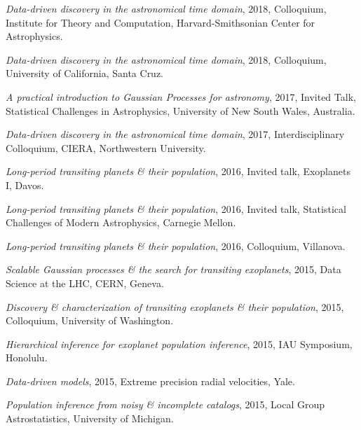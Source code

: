 \documentclass[12pt,letterpaper]{article}
\begin{document}
\begin{list}{}{\cvlist}

\item \emph{Data-driven discovery in the astronomical time domain},
    2018, Colloquium, Institute for Theory and Computation,
    Harvard-Smithsonian Center for Astrophysics.

\item \emph{Data-driven discovery in the astronomical time domain},
    2018, Colloquium, University of California, Santa Cruz.

\item \emph{A practical introduction to Gaussian Processes for astronomy},
    2017, Invited Talk, Statistical Challenges in Astrophysics,
    University of New South Wales, Australia.

\item \emph{Data-driven discovery in the astronomical time domain},
    2017, Interdisciplinary Colloquium, CIERA, Northwestern University.

\item \emph{Long-period transiting planets \& their population},
    2016, Invited talk, Exoplanets I, Davos.

\item \emph{Long-period transiting planets \& their population},
    2016, Invited talk, Statistical Challenges of Modern Astrophysics,
    Carnegie Mellon.

\item \emph{Long-period transiting planets \& their population}, 2016,
    Colloquium, Villanova.

\item \emph{Scalable Gaussian processes \& the search for transiting
    exoplanets}, 2015, Data Science at the LHC, CERN, Geneva.

\item \emph{Discovery \& characterization of transiting exoplanets \& their
    population}, 2015, Colloquium, University of Washington.

\item \emph{Hierarchical inference for exoplanet population inference},
    2015, IAU Symposium, Honolulu.

\item \emph{Data-driven models}, 2015, Extreme precision radial velocities,
    Yale.

\item \emph{Population inference from noisy \& incomplete catalogs}, 2015,
    Local Group Astrostatistics, University of Michigan.


\end{list}
\end{document}
